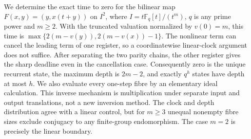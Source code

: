 We determine the exact time to zero for the bilinear map
$F(x,y)=(y,x(t+y))$ on $I^2$, where
$I=t\mathbb F_q[t]/(t^m)$, $q$ is any prime power and $m\geq2$.
With the truncated valuation normalized by $v(0)=m$, this time is
$\max\{2(m-v(y)),2(m-v(x))-1\}$.
The nonlinear term can cancel the leading term of one register, so a
coordinatewise linear-clock argument does not suffice. After separating the
two parity chains, the other register gives the sharp deadline even in the
cancellation case. Consequently zero is the unique recurrent state, the
maximum depth is $2m-2$, and exactly $q^h$ states have depth at most $h$.
We also evaluate every one-step fibre by an elementary ideal calculation.
This inverse mechanism is multiplication under separate input and output
translations, not a new inversion method. The clock and depth distribution
agree with a linear control, but for $m\geq3$ unequal nonempty fibre sizes
exclude conjugacy to any finite-group endomorphism. The case $m=2$ is
precisely the linear boundary.
